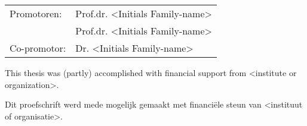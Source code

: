 \thispagestyle{empty}

\begin{table}
\begin{tabular}{l l}
\Large Promotoren: & \Large Prof.dr. <Initials Family-name>\\
& \Large Prof.dr. <Initials Family-name>\\
\Large Co-promotor: & \Large Dr. <Initials Family-name>
\end{tabular}
\end{table}
\hspace{0em}
\vfill

{\flushleft\large

This thesis was (partly) accomplished with financial support from <institute or organization>.

Dit proefschrift werd mede mogelijk gemaakt met financi\"ele steun van
<instituut of organisatie>.}
